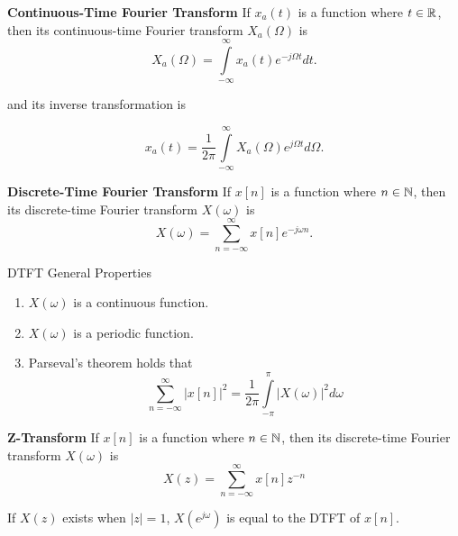 \begin{defn}{\textbf{Continuous-Time Fourier Transform}}
If $x_a(t)$ is a function where $t \in \mathbb{R}$, then its continuous-time Fourier transform $X_a(\Omega)$ is 
\begin{equation}
X_a(\Omega) = \int\limits_{ - \infty }^\infty  {{x_a}(t){e^{ - j\Omega t}}dt}.
\end{equation}

and its inverse transformation is

\begin{equation}
{x_a}\left( t \right) = \frac{1}{{2\pi }}\int\limits_{ - \infty }^\infty  {{X_a}(\Omega ){e^{ j\Omega t}}d\Omega }. 
\end{equation}
\end{defn}

\begin{defn}{\textbf{Discrete-Time Fourier Transform}}
If $x[n]$ is a function where $n \in \mathbb{N}$, then its discrete-time Fourier transform $X(\omega)$ is 
\begin{equation}
X(\omega) = \sum\limits_{n =  - \infty }^\infty  {x[n]{e^{ - j\omega n}}}. 
\end{equation}
\end{defn}

DTFT General Properties

\begin{enumerate}
    \item $X(\omega)$ is a continuous function.
    \item $X(\omega)$ is a periodic function.
    \item Parseval's theorem holds that
     \begin{equation}
        \sum\limits_{n =  - \infty }^\infty  {{{\left| {x[n]} \right|}^2}}  = \frac{1}{{2\pi }}\int\limits_{ - \pi }^\pi  {{{\left| {X(\omega )} \right|}^2}d\omega } 
    \end{equation}
\end{enumerate}

\begin{defn}{\textbf{{Z-Transform}}}
If $x[n]$ is a function where $n \in \mathbb{N}$, then its discrete-time Fourier transform $X(\omega)$ is 
\begin{equation}
    X(z) = \sum\limits_{n = -\infty}^\infty {x[n] z^{-n}}
\end{equation}
\end{defn}    

If $X(z)$ exists when $|z| = 1$, $X(e^{j \omega})$ is equal to the DTFT of $x[n]$. 


